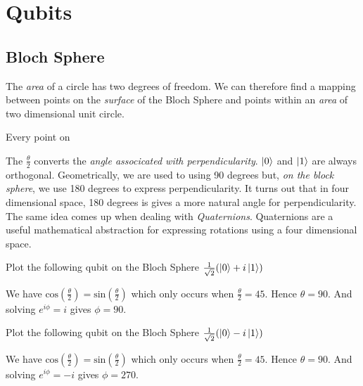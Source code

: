 
\chapter{Qubits}



\section{Bloch Sphere}



The \textit{area} of a circle has two degrees of freedom. 
We can therefore find a mapping between points on the \textit{surface} of the Bloch Sphere and points 
within an \textit{area} of two dimensional unit circle. 

Every point on 





The $\frac{\theta}{2}$ converts the \textit{angle associcated with perpendicularity}. 
$\left|0\right\rangle$ and $\left|1\right\rangle$ are always orthogonal. Geometrically, we are used to using 90 degrees
but, \textit{on the block sphere}, we use 180 degrees to express perpendicularity. 
It turns out that in four dimensional space, 180 degrees is gives a more natural 
angle for perpendicularity. The same idea comes up when dealing with \textit{Quaternions}. 
Quaternions are a useful mathematical abstraction for expressing rotations 
using a four dimensional space.


\begin{example}
Plot the following qubit on the Bloch Sphere $\frac{1}{\sqrt{2}}(\left|0\right\rangle + i\left|1\right\rangle)$

We have  $\text{cos}(\frac{\theta}{2}) = \text{sin}(\frac{\theta}{2})$
which only occurs when $\frac{\theta}{2} = 45$. Hence $\theta = 90$.
And solving  $e^{i\phi} = i$ gives $\phi = 90$.
\end{example}

\begin{example}
Plot the following qubit on the Bloch Sphere $\frac{1}{\sqrt{2}}(\left|0\right\rangle - i\left|1\right\rangle)$

We have  $\text{cos}(\frac{\theta}{2}) = \text{sin}(\frac{\theta}{2})$
which only occurs when $\frac{\theta}{2} = 45$. Hence $\theta = 90$.
And solving  $e^{i\phi} = -i$ gives $\phi = 270$.
\end{example}


